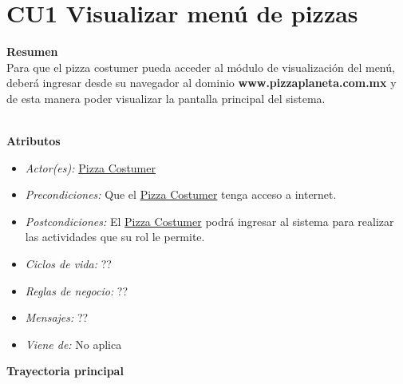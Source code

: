 
\pagebreak
\hypertarget{CU1}{}
\section{CU1 Visualizar menú de pizzas}

	\noindent \textbf{Resumen}\\

		Para que el pizza costumer pueda acceder al módulo de visualización del menú, deberá ingresar desde su navegador al dominio {\textbf{www.pizzaplaneta.com.mx}} y de esta manera poder visualizar la pantalla principal del sistema.

	\noindent \textbf{\\Atributos}

		\begin{itemize}

			\item \textit{Actor(es):} \hyperlink{A:Pizza Costumer}{Pizza Costumer}
			\item \textit{Precondiciones:} Que el \hyperlink{A:Pizza Costumer}{Pizza Costumer} tenga acceso a internet. 
			\item \textit{Postcondiciones:} El \hyperlink{A:Pizza Costumer}{Pizza Costumer} podrá ingresar al sistema para realizar las actividades que su rol le permite.
			\item \textit{Ciclos de vida:} ??
			\item \textit{Reglas de negocio:} ??
			\item \textit{Mensajes:} ??
			\item \textit{Viene de:} No aplica

		\end{itemize} 

	\noindent \textbf{Trayectoria principal}

